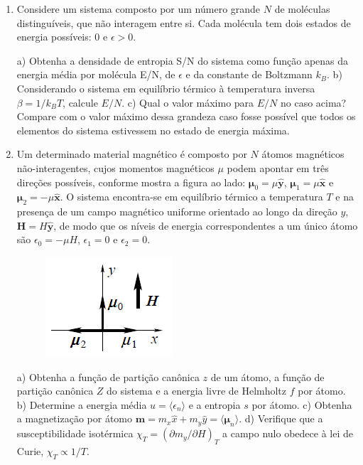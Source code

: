 \begin{enumerate}[start=1,label={\bfseries Q\arabic*.}]
\item Considere um sistema composto por um número grande $N$ de moléculas distinguíveis, que não interagem entre si. Cada molécula tem dois estados de energia possíveis: 0 e $\epsilon > 0$.


a) Obtenha a densidade de entropia S/N do sistema como função apenas da energia média por molécula E/N, de $\epsilon$ e da constante de Boltzmann $k_{B}$.
b) Considerando o sistema em equilíbrio térmico à temperatura inversa $\beta = 1 / k_{B}T$, calcule $E/N$.
c) Qual o valor máximo para $E/N$ no caso acima? Compare com o valor máximo dessa grandeza caso fosse possível que todos os elementos do sistema estivessem no estado de energia máxima.




\item Um determinado material magnético é composto por $N$ átomos magnéticos não-interagentes, cujos momentos magnéticos $\mu$ podem apontar em três direções possíveis, conforme mostra a figura ao lado: $\boldsymbol{\mu}_{0} = \mu \hat{\boldsymbol{y}}$, $\boldsymbol{\mu}_{1} = \mu \hat{\boldsymbol{x}}$ e $\boldsymbol{\mu}_{2} = - \mu \hat{\boldsymbol{x}}$. O sistema encontra-se em equilíbrio térmico a temperatura $T$ e na presença de um campo magnético uniforme orientado ao longo da direção $y$, $\boldsymbol{H} = H \hat{\boldsymbol{y}}$, de modo que os níveis de energia correspondentes a um único átomo são $\epsilon_{0}= -\mu H$, $\epsilon_{1}= 0$ e $\epsilon_{2}= 0$.

\begin{figure}[H]
  \centering
  \includegraphics[scale=0.8]{termica-img/momento.png}
\end{figure}


a) Obtenha a função de partição canônica $z$ de um átomo, a função de partição canônica $Z$ do sistema e a energia livre de Helmholtz $f$ por átomo.
b) Determine a energia média $u = \langle \epsilon_{n} \rangle$ e a entropia $s$ por átomo.
c) Obtenha a magnetização por átomo $\mathbf{m} = m_{x}\hat{x} + m_{y} \hat{y} = \langle \boldsymbol{\mu}_{n} \rangle$.
d) Verifique que a susceptibilidade isotérmica $\chi_{T} = (\partial m_{y} / \partial H)_{T}$ a campo nulo obedece à lei de Curie, $\chi_{T}  \propto 1/T$.






\end{enumerate}
